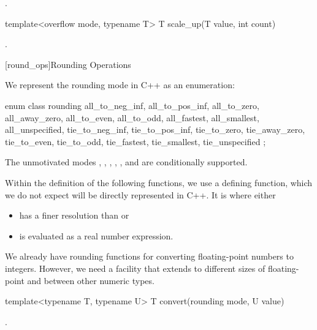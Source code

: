 \begin{itemdescr}
\returns {}.	
\end{itemdescr}

\begin{itemdecl}
template<overflow mode, typename T> T scale_up(T value, int count)		
\end{itemdecl}

\begin{itemdescr}
\returns {}.	
\end{itemdescr}

[round_ops]{Rounding Operations}

We represent the rounding mode in C++ as an enumeration:

\begin{codeblock}
enum class rounding {
	all_to_neg_inf, all_to_pos_inf,
	all_to_zero, all_away_zero,
	all_to_even, all_to_odd,
	all_fastest, all_smallest,
	all_unspecified,
	tie_to_neg_inf, tie_to_pos_inf,
	tie_to_zero, tie_away_zero,
	tie_to_even, tie_to_odd,
	tie_fastest, tie_smallest,
	tie_unspecified
};
\end{codeblock}

The unmotivated modes , , , , , and  are conditionally supported.

Within the definition of the following functions, we use a defining function, which we do not expect will be directly represented in C++. It is  where  either

\begin{itemize}
\item has a finer resolution than  or
\item is evaluated as a real number expression.
\end{itemize}

We already have rounding functions for converting floating-point numbers to integers. However, we need a facility that extends to different sizes of floating-point and between other numeric types.

\begin{itemdecl}
template<typename T, typename U> T convert(rounding mode, U value)		
\end{itemdecl}

\begin{itemdescr}
\returns {}.	
\end{itemdescr}

